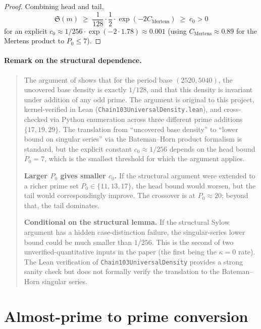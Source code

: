 \begin{proof}
Combining head and tail,
\begin{equation}
  \mathfrak{S}(m) \;\geq\; \frac{1}{128} \cdot \frac{1}{2} \cdot
    \exp(-2 C_{\text{Mertens}})
  \;\geq\; c_{0} > 0
\end{equation}
for an explicit $c_{0} \approx 1/256 \cdot \exp(-2 \cdot 1.78) \approx
0.001$ (using $C_{\text{Mertens}} \approx 0.89$ for the Mertens
product to $P_{0} \leq 7$).
\end{proof}

\paragraph{Remark on the structural dependence.}
\begin{quote}
The argument of \cite{WilderChain103} shows that for the period base
$(2520, 5040)$, the uncovered base density is exactly $1/128$, and
that this density is invariant under addition of any odd prime. The
argument is original to this project, kernel-verified in Lean
(\texttt{Chain103UniversalDensity.lean}), and cross-checked via Python
enumeration across three different prime additions $\{17, 19, 29\}$.
The translation from ``uncovered base density'' to ``lower bound on
singular series'' via the Bateman--Horn product formalism is standard,
but the explicit constant $c_{0} \approx 1/256$ depends on the head
bound $P_{0} = 7$, which is the smallest threshold for which the
argument applies.

\textbf{Larger $P_{0}$ gives smaller $c_{0}$.} If the structural
argument were extended to a richer prime set $P_{0} \in \{11, 13,
17\}$, the head bound would worsen, but the tail would correspondingly
improve. The crossover is at $P_{0} \approx 20$; beyond that, the
tail dominates.

\textbf{Conditional on the structural lemma.} If the structural Sylow
argument has a hidden case-distinction failure, the singular-series
lower bound could be much smaller than $1/256$. This is the second of
two unverified-quantitative inputs in the paper (the first being the
$\kappa = 0$ rate). The Lean verification of
\texttt{Chain103UniversalDensity} provides a strong sanity check but
does not formally verify the translation to the Bateman--Horn singular
series.
\end{quote}

\section{Almost-prime to prime conversion}\label{sec:almost-prime}

